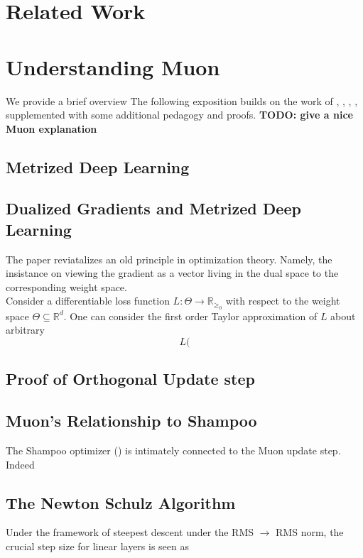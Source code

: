 \documentclass[12pt]{book}
\newcommand{\R}{\mathbb{R}}
\newcommand{\todo}[1]{{\color{red}\bf{TODO: #1}}}
\begin{document}
\section{Related Work}
\section{Understanding Muon}
We provide a brief overview 
The following exposition builds on the work of \cite{bernstein2024modulardualitydeeplearning}, \cite{bernstein2024oldoptimizernewnorm}, \cite{bernstein2025deriving}, \cite{jordan2024muon}, \cite{pethick2025trainingdeeplearningmodels} supplemented with some additional pedagogy and proofs.
\todo{give a nice Muon explanation}
\\

\subsection{Metrized Deep Learning}

\subsection{Dualized Gradients and Metrized Deep Learning}
The paper \cite{bernstein2024modulardualitydeeplearning} reviatalizes an old principle in optimization theory. Namely, the insistance on viewing the gradient as a vector living in the dual space to the corresponding weight space.  \\
Consider a differentiable loss function $L:\Theta \to \R_{\ge_0}$ with respect to the weight space $\Theta \subseteq \R^{d}$. One can consider the first order Taylor approximation of $L$ about arbitrary
\[
 L(
\]
\subsection{Proof of Orthogonal Update step}
\subsection{Muon's Relationship to Shampoo}
The Shampoo optimizer (\cite{gupta2018shampoopreconditionedstochastictensor}) is intimately connected to the Muon update step. 
\\ 
Indeed 
\subsection{The Newton Schulz Algorithm}
Under the framework of steepest descent under the RMS $\to$ RMS norm, the crucial step size for linear layers is seen as 
\end{document}
